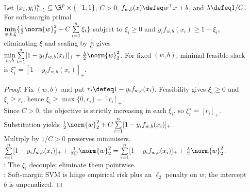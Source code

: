 \begin{proposition} \label{prop:sl-svm-hinge-loss-penalty-equivalence} \\
Let $(x_i,y_i)_{i=1}^n\subseteq\R^p\times\{-1,1\}$, $C>0$, $f_{w,b}(x)\defeq w^\top x+b$, and $\lambda\defeq1/C$. For soft-margin primal\\
$\min\limits_{w,b,\xi}\{\frac12\norm{w}_2^2+C\sum\limits_{i=1}^n\xi_i\}$ subject to $\xi_i\geq0$ and $y_if_{w,b}(x_i)\geq1-\xi_i$, eliminating $\xi$ and scaling by $\frac1C$ gives\\
$\min\limits_{w,b}\sum\limits_{i=1}^n[1-y_if_{w,b}(x_i)]_++\frac{\lambda}{2}\norm{w}_2^2$. For fixed $(w,b)$, minimal feasible slack is $\xi_i^\star=[1-y_if_{w,b}(x_i)]_+$.
\end{proposition}
\begin{proof} Fix $(w,b)$ and put $r_i\defeq1-y_if_{w,b}(x_i)$. Feasibility gives $\xi_i\geq0$ and $\xi_i\geq r_i$, hence $\xi_i\geq\max\{0,r_i\}=[r_i]_+$.\\
Since $C>0$, the objective is strictly increasing in each $\xi_i$, so $\xi_i^\star=[r_i]_+$.\\
Substitution yields $\frac12\norm{w}_2^2+C\sum\limits_{i=1}^n[1-y_if_{w,b}(x_i)]_+$.\\
Multiply by $1/C>0$ preserves minimisers, $\sum\limits_{i=1}^n[1-y_if_{w,b}(x_i)]_++\frac{1}{2C}\norm{w}_2^2=\sum\limits_{i=1}^n[1-y_if_{w,b}(x_i)]_++\frac{\lambda}{2}\norm{w}_2^2$.\\
: The $\xi_i$ decouple; eliminate them pointwise.\\
: Soft-margin SVM is hinge empirical risk plus an $\ell_2$ penalty on $w$; the intercept $b$ is unpenalized.
\end{proof}

